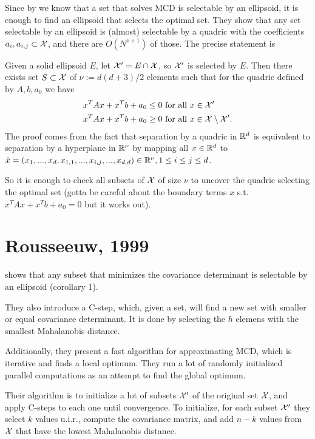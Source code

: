 \documentclass{article}
\begin{document}
Since by \cite{rousseeuw1999fast} we know that a set that solves MCD is selectable by an ellipsoid, it is enough to find an ellipsoid that selects the optimal set. They show that any set selectable by an ellipsoid is (almost) selectable by a quadric with the coefficients $a_i, a_{i,j} \subset \mathcal{X}$, and there are $O(N^{\nu+1})$ of those. The precise statement is

\begin{theorem}
Given a solid ellipsoid $E$, let $\mathcal{X}' = E\cap \mathcal{X}$, so $\mathcal{X}'$ is selected by $E$. Then there exists set $S\subset \mathcal{X}$ of $\nu := d(d+3)/2$ elements such that for the quadric defined by $A, b, a_0$ we have
\begin{align*}
x^TAx + x^Tb + a_0 \leq 0 &\text{ for all $x\in \mathcal{X}'$}\\
x^TAx + x^Tb + a_0 \geq 0 &\text{ for all $x\in \mathcal{X}\setminus\mathcal{X}'$}.
\end{align*}
The proof comes from the fact that separation by a quadric in $\mathbb{R}^d$ is equivalent to separation by a hyperplane in $\mathbb{R}^\nu$ by mapping all $x\in \mathbb{R}^d$ to $\hat{x} = (x_1,...,x_d,x_{1,1},..., x_{i,j},...,x_{d,d})\in \mathbb{R}^\nu, 1\leq i\leq j \leq d$.

So it is enough to check all subsets of $\mathcal{X}$ of size $\nu$ to uncover the quadric selecting the optimal set (gotta be careful about the boundary terms $x$ s.t. $x^TAx + x^Tb + a_0 = 0$ but it works out).

\end{theorem}

\section{Rousseeuw, 1999}
\cite{rousseeuw1999fast} shows that any subset that minimizes the covariance determinant is selectable by an ellipsoid (corollary 1). 

They also introduce a C-step, which, given a set, will find a new set with smaller or equal covariance determinant. It is done by selecting the $h$ elemens with the smallest Mahalanobis distance.

Additionally, they present a fast algorithm for approximating MCD, which is iterative and finds a local optimum. They run a lot of randomly initialized parallel computations as an attempt to find the global optimum.

Their algorithm is to initialize a lot of subsets $\mathcal{X}'$ of the original set $\mathcal{X}$, and apply C-steps to each one until convergence. To initialize, for each subset $\mathcal{X}'$ they select $k$ values u.i.r., compute the covariance matrix, and add $n-k$ values from $\mathcal{X}$ that have the lowest Mahalanobis distance.
\end{document}
